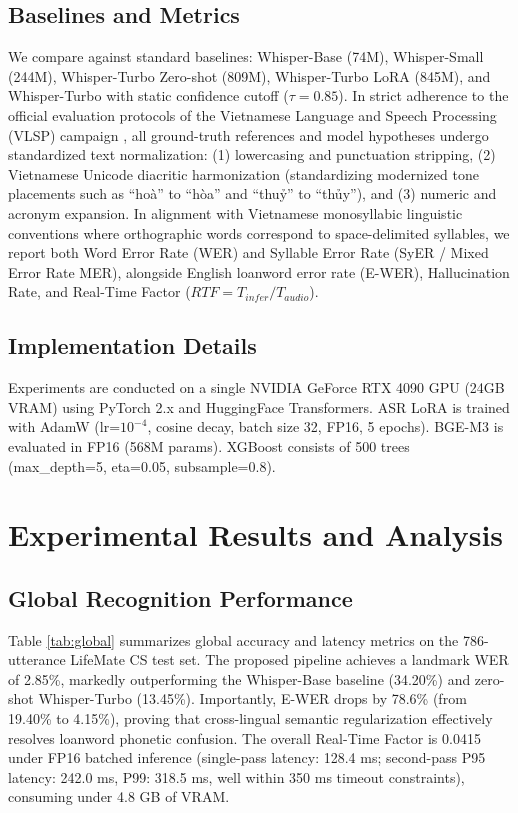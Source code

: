 \documentclass[9pt, conference, a4paper, compsocconf]{IEEEtran}
\begin{document}
\subsection{Baselines and Metrics}
We compare against standard baselines: Whisper-Base (74M), Whisper-Small (244M), Whisper-Turbo Zero-shot (809M), Whisper-Turbo LoRA (845M), and Whisper-Turbo with static confidence cutoff ($\tau=0.85$). In strict adherence to the official evaluation protocols of the Vietnamese Language and Speech Processing (VLSP) campaign \cite{luong2022vlsp}, all ground-truth references and model hypotheses undergo standardized text normalization: (1) lowercasing and punctuation stripping, (2) Vietnamese Unicode diacritic harmonization (standardizing modernized tone placements such as ``hoà'' to ``hòa'' and ``thuỷ'' to ``thủy''), and (3) numeric and acronym expansion. In alignment with Vietnamese monosyllabic linguistic conventions where orthographic words correspond to space-delimited syllables, we report both Word Error Rate (WER) and Syllable Error Rate (SyER / Mixed Error Rate MER), alongside English loanword error rate (E-WER), Hallucination Rate, and Real-Time Factor ($RTF = T_{infer} / T_{audio}$).

\subsection{Implementation Details}
Experiments are conducted on a single NVIDIA GeForce RTX 4090 GPU (24GB VRAM) using PyTorch 2.x and HuggingFace Transformers. ASR LoRA is trained with AdamW (lr=$10^{-4}$, cosine decay, batch size 32, FP16, 5 epochs). BGE-M3 is evaluated in FP16 (568M params). XGBoost consists of 500 trees (max\_depth=5, eta=0.05, subsample=0.8).

\section{Experimental Results and Analysis}

\subsection{Global Recognition Performance}
Table \ref{tab:global} summarizes global accuracy and latency metrics on the 786-utterance LifeMate CS test set. The proposed pipeline achieves a landmark WER of 2.85\%, markedly outperforming the Whisper-Base baseline (34.20\%) and zero-shot Whisper-Turbo (13.45\%). Importantly, E-WER drops by 78.6\% (from 19.40\% to 4.15\%), proving that cross-lingual semantic regularization effectively resolves loanword phonetic confusion. The overall Real-Time Factor is 0.0415 under FP16 batched inference (single-pass latency: 128.4 ms; second-pass P95 latency: 242.0 ms, P99: 318.5 ms, well within 350 ms timeout constraints), consuming under 4.8 GB of VRAM.
\end{document}
